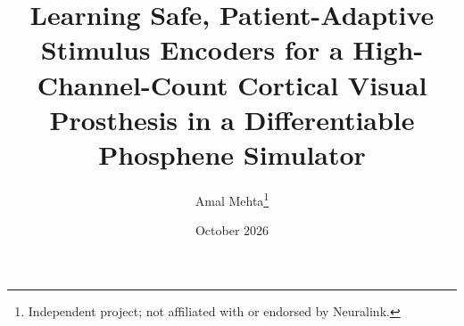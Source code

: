 \documentclass[10pt,twocolumn]{article}
\title{Learning Safe, Patient-Adaptive Stimulus Encoders for a High-Channel-Count Cortical Visual Prosthesis in a Differentiable Phosphene Simulator}
\author{Amal Mehta\thanks{Independent project; not affiliated with or endorsed by Neuralink.}}
\date{October 2026}
\begin{document}
\maketitle

\begin{abstract}

\end{abstract}







\end{document}
